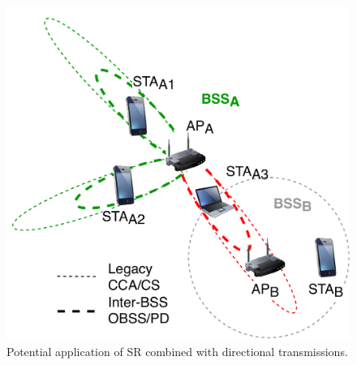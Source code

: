 \documentclass{ieeeaccess}
\begin{document}
\begin{figure}[ht!]
	\centering		
	\includegraphics[width=0.8\columnwidth]{sr_and_beamforming}
	\caption{Potential application of SR combined with directional transmissions.}
	\label{fig:sr_and_beamforming}
\end{figure}
\end{document}
